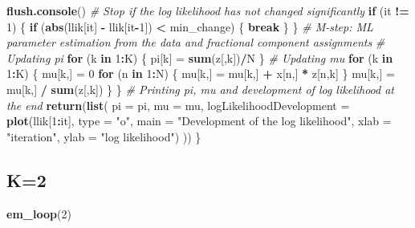 \documentclass[]{article}
\newenvironment{Shaded}{\begin{snugshade}}{\end{snugshade}}
\newcommand{\KeywordTok}[1]{\textcolor[rgb]{0.13,0.29,0.53}{\textbf{#1}}}
\newcommand{\DataTypeTok}[1]{\textcolor[rgb]{0.13,0.29,0.53}{#1}}
\newcommand{\DecValTok}[1]{\textcolor[rgb]{0.00,0.00,0.81}{#1}}
\newcommand{\StringTok}[1]{\textcolor[rgb]{0.31,0.60,0.02}{#1}}
\newcommand{\CommentTok}[1]{\textcolor[rgb]{0.56,0.35,0.01}{\textit{#1}}}
\newcommand{\ControlFlowTok}[1]{\textcolor[rgb]{0.13,0.29,0.53}{\textbf{#1}}}
\newcommand{\OperatorTok}[1]{\textcolor[rgb]{0.81,0.36,0.00}{\textbf{#1}}}
\newcommand{\NormalTok}[1]{#1}
\begin{document}
\begin{Shaded}
\begin{Highlighting}[]
\KeywordTok{flush.console}\NormalTok{()}
\CommentTok{# Stop if the log likelihood has not changed significantly}
\ControlFlowTok{if}\NormalTok{ (it }\OperatorTok{!=}\StringTok{ }\DecValTok{1}\NormalTok{) \{}
\ControlFlowTok{if}\NormalTok{ (}\KeywordTok{abs}\NormalTok{(llik[it] }\OperatorTok{-}\StringTok{ }\NormalTok{llik[it}\OperatorTok{-}\DecValTok{1}\NormalTok{]) }\OperatorTok{<}\StringTok{ }\NormalTok{min_change) \{}
\ControlFlowTok{break}
\NormalTok{\}}
\NormalTok{\}}
\CommentTok{# M-step: ML parameter estimation from the data and fractional component assignments}
\CommentTok{# Updating pi}
\ControlFlowTok{for}\NormalTok{ (k }\ControlFlowTok{in} \DecValTok{1}\OperatorTok{:}\NormalTok{K) \{}
\NormalTok{pi[k] =}\StringTok{ }\KeywordTok{sum}\NormalTok{(z[,k])}\OperatorTok{/}\NormalTok{N}
\NormalTok{\}}
\CommentTok{# Updating mu}
\ControlFlowTok{for}\NormalTok{ (k }\ControlFlowTok{in} \DecValTok{1}\OperatorTok{:}\NormalTok{K) \{}
\NormalTok{mu[k,] =}\StringTok{ }\DecValTok{0}
\ControlFlowTok{for}\NormalTok{ (n }\ControlFlowTok{in} \DecValTok{1}\OperatorTok{:}\NormalTok{N) \{}
\NormalTok{    mu[k,] =}\StringTok{ }\NormalTok{mu[k,] }\OperatorTok{+}\StringTok{ }\NormalTok{x[n,] }\OperatorTok{*}\StringTok{ }\NormalTok{z[n,k]}
\NormalTok{\}}
\NormalTok{mu[k,] =}\StringTok{ }\NormalTok{mu[k,] }\OperatorTok{/}\StringTok{ }\KeywordTok{sum}\NormalTok{(z[,k])}
\NormalTok{\}}
\NormalTok{\}}
\CommentTok{# Printing pi, mu and development of log likelihood at the end}
\KeywordTok{return}\NormalTok{(}\KeywordTok{list}\NormalTok{(}
\DataTypeTok{pi =}\NormalTok{ pi,}
\DataTypeTok{mu =}\NormalTok{ mu,}
\DataTypeTok{logLikelihoodDevelopment =} \KeywordTok{plot}\NormalTok{(llik[}\DecValTok{1}\OperatorTok{:}\NormalTok{it],}
\DataTypeTok{type =} \StringTok{"o"}\NormalTok{,}
\DataTypeTok{main =} \StringTok{"Development of the log likelihood"}\NormalTok{,}
\DataTypeTok{xlab =} \StringTok{"iteration"}\NormalTok{,}
\DataTypeTok{ylab =} \StringTok{"log likelihood"}\NormalTok{)}
\NormalTok{))}
\NormalTok{\}}
\end{Highlighting}
\end{Shaded}

\subsection{K=2}\label{k2}

\begin{Shaded}
\begin{Highlighting}[]
\KeywordTok{em_loop}\NormalTok{(}\DecValTok{2}\NormalTok{)}
\end{Highlighting}
\end{Shaded}
\end{document}
